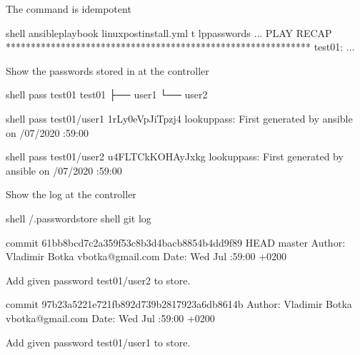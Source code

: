 \documentclass[letterpaper,10pt,english]{sphinxmanual}
\begin{document}
The command is idempotent

%
\begin{sphinxVerbatim}[commandchars=\\\{\}]
shell\PYGZgt{} ansible\PYGZhy{}playbook linux\PYGZhy{}postinstall.yml \PYGZhy{}t lp\PYGZus{}passwords
...
PLAY RECAP *************************************************************
test\PYGZus{}01:       ...
\end{sphinxVerbatim}
\sphinxresetverbatimhllines

Show the passwords stored in  at the controller

%
\begin{sphinxVerbatim}[commandchars=\\\{\}]
shell\PYGZgt{} pass test\PYGZus{}01
test\PYGZus{}01
├── user1
└── user2

shell\PYGZgt{} pass test\PYGZus{}01/user1
1rLy0eVpJiTpzj\PYGZhy{}4
lookup\PYGZus{}pass: First generated by ansible on /07/2020 :59:00

shell\PYGZgt{} pass test\PYGZus{}01/user2
u4FLTCkKOHAyJxkg
lookup\PYGZus{}pass: First generated by ansible on /07/2020 :59:00
\end{sphinxVerbatim}
\sphinxresetverbatimhllines

Show the  log at the controller

%
\begin{sphinxVerbatim}[commandchars=\\\{\}]
shell\PYGZgt{}  \PYGZti{}/.password\PYGZhy{}store
shell\PYGZgt{} git log

commit 61bb8bcd7c2a359f53c8b3d4bacb8854b4dd9f89 HEAD \PYGZhy{}\PYGZgt{} master
Author: Vladimir Botka \PYGZlt{}vbotka@gmail.com\PYGZgt{}
Date:   Wed Jul  :59:00  +0200

    Add given password  test\PYGZus{}01/user2 to store.

commit 97b23a5221e721fb892d739b2817923a6db8614b
Author: Vladimir Botka \PYGZlt{}vbotka@gmail.com\PYGZgt{}
Date:   Wed Jul  :59:00  +0200

    Add given password  test\PYGZus{}01/user1 to store.
\end{sphinxVerbatim}
\sphinxresetverbatimhllines
\end{document}

